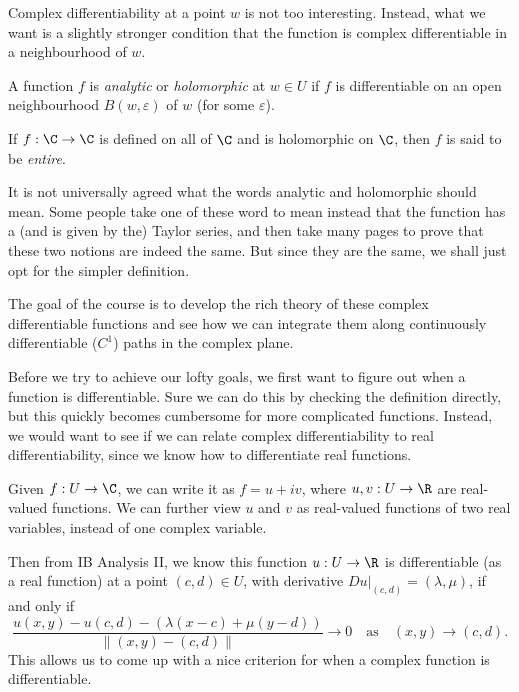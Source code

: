 \documentclass[a4paper]{article}
\begin{document}
Complex differentiability at a point $w$ is not too interesting. Instead, what we want is a slightly stronger condition that the function is complex differentiable in a neighbourhood of $w$.

\begin{defi}
  A function $f$ is \emph{analytic} or \emph{holomorphic} at $w \in U$ if $f$ is differentiable on an open neighbourhood $B(w, \varepsilon)$ of $w$ (for some $\varepsilon$).
\end{defi}

\begin{defi}
  If $f: \C \to \C$ is defined on all of $\C$ and is holomorphic on $\C$, then $f$ is said to be \emph{entire}.
\end{defi}

It is not universally agreed what the words analytic and holomorphic should mean. Some people take one of these word to mean instead that the function has a (and is given by the) Taylor series, and then take many pages to prove that these two notions are indeed the same. But since they are the same, we shall just opt for the simpler definition.

The goal of the course is to develop the rich theory of these complex differentiable functions and see how we can integrate them along continuously differentiable ($C^1$) paths in the complex plane.

Before we try to achieve our lofty goals, we first want to figure out when a function is differentiable. Sure we can do this by checking the definition directly, but this quickly becomes cumbersome for more complicated functions. Instead, we would want to see if we can relate complex differentiability to real differentiability, since we know how to differentiate real functions.

Given $f: U \to \C$, we can write it as $f = u + iv$, where $u, v: U \to \R$ are real-valued functions. We can further view $u$ and $v$ as real-valued functions of two real variables, instead of one complex variable.

Then from IB Analysis II, we know this function $u: U \to \R$ is differentiable (as a real function) at a point $(c, d) \in U$, with derivative $Du|_{(c, d)} = (\lambda, \mu)$, if and only if
\[
  \frac{u(x, y) - u(c, d) - (\lambda (x - c) + \mu (y - d))}{\|(x, y) - (c, d)\|} \to 0\quad \text{as}\quad (x, y) \to (c, d).
\]
This allows us to come up with a nice criterion for when a complex function is differentiable.
\end{document}
